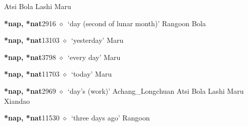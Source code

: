 \begin{list}{}{\leftmargin=1.5em \itemindent=-1.5em}
\hspace{1ex}
         Atsi 
\hspace{1ex}
         Bola 
\hspace{1ex}
         Lashi 
\hspace{1ex}
         Maru 
  \item {\footnotesize \textbf{*nap, *nat}}{\tiny 2916}
\hspace{1ex}
         $\diamond$~`day (second of lunar month)'
         Rangoon 
\hspace{1ex}
         Bola 
  \item {\footnotesize \textbf{*nap, *nat}}{\tiny 13103}
\hspace{1ex}
         $\diamond$~`yesterday'
         Maru 
  \item {\footnotesize \textbf{*nap, *nat}}{\tiny 3798}
\hspace{1ex}
         $\diamond$~`every day'
         Maru 
  \item {\footnotesize \textbf{*nap, *nat}}{\tiny 11703}
\hspace{1ex}
         $\diamond$~`today'
         Maru 
  \item {\footnotesize \textbf{*nap, *nat}}{\tiny 2969}
\hspace{1ex}
         $\diamond$~`day's (work)'
         Achang\_Longchuan 
\hspace{1ex}
         Atsi 
\hspace{1ex}
         Bola 
\hspace{1ex}
         Lashi 
\hspace{1ex}
         Maru 
\hspace{1ex}
         Xiandao 
  \item {\footnotesize \textbf{*nap, *nat}}{\tiny 11530}
\hspace{1ex}
         $\diamond$~`three days ago'
         Rangoon 

\end{list}
